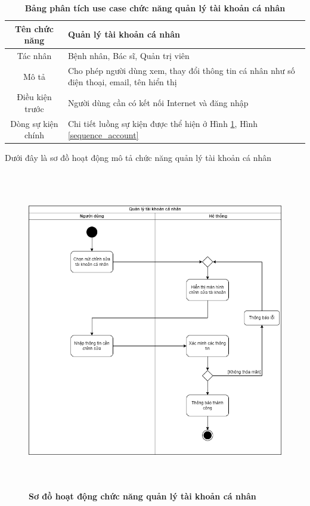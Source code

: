   \begin{table}[H]
    \caption{\bfseries \fontsize{12pt}{0pt}\selectfont Bảng phân tích use case chức năng quản lý tài khoản cá nhân}
    \centering
    \begin{tabularx}{0.9\textwidth}{|c|X|}
      \hline
      \textbf{Tên chức năng} & \textbf{Quản lý tài khoản cá nhân} \\
      \hline
      Tác nhân & Bệnh nhân, Bác sĩ, Quản trị viên \\
      \hline
      Mô tả & Cho phép người dùng xem, thay đổi thông tin cá nhân như số điện thoại, email, tên hiển thị
       \\
      \hline
      Điều kiện trước & Người dùng cần có kết nối Internet và đăng nhập \\
      \hline
      Dòng sự kiện chính & 
        Chi tiết luồng sự kiện được thể hiện ở Hình \ref{activity_manage_info}, Hình \ref{sequence_account} 
        \\
      \hline
    \end{tabularx}
  \end{table}
  Dưới đây là sơ đồ hoạt động mô tả chức năng quản lý tài khoản cá nhân
  \begin{figure}[H]
    \centering
    \includegraphics[width=13.5cm,height=14cm]{Images/acitivity/activity_manage_info.png}
    \caption[Sơ đồ hoạt động chức năng quản lý tài khoản cá nhân]{\bfseries \fontsize{12pt}{0pt}
    \selectfont Sơ đồ hoạt động chức năng quản lý tài khoản cá nhân}
    \label{activity_manage_info} %
  \end{figure}

